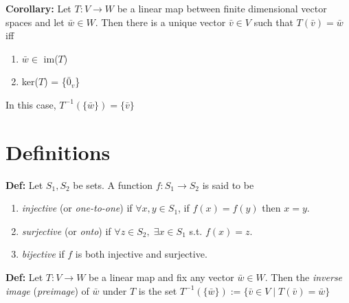\bigskip

\noindent 
\textbf{Corollary:} Let $T: V \rightarrow W$ be a linear map between finite dimensional vector spaces and let $\bar w \in W$. Then there is a unique vector $\bar v \in V$ such that $T(\bar v) = \bar w$ iff 
\begin{enumerate}
    \item $\bar w \in $ im($T$)
    \item ker($T$) = \{$\bar 0_v$\} 
\end{enumerate}
In this case, $T^{-1}(\{\bar w\}) = \{\bar v\}$


\section*{Definitions}
\textbf{Def:} Let $S_1, S_2$ be sets. A function $f: S_1 \rightarrow S_2$ is said to be 
\begin{enumerate}
    \item \textit{injective} (or \textit{one-to-one}) if $\forall x,y \in S_1$, if $f(x) = f(y)$ then $x = y$.
    \item \textit{surjective} (or \textit{onto}) if $\forall z \in S_2, \; \exists x \in S_1$ s.t. $f(x) = z$. 
    \item \textit{bijective} if $f$ is both injective and surjective. 
\end{enumerate}

\noindent 
\textbf{Def:} Let $T: V \rightarrow W$ be a linear map and fix any vector $\bar w \in W$. Then the \textit{inverse image} (\textit{preimage}) of $\bar w$ under $T$ is the set $T^{-1}(\{\bar w\}) := \{\bar v \in V \mid T(\bar v) = \bar w\}$ 